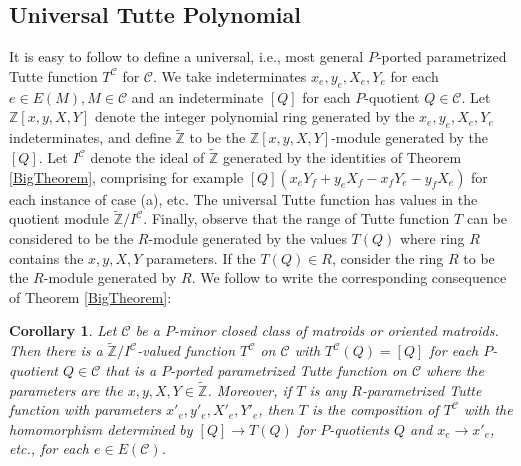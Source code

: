 \documentclass[12pt,leqno]{amsart}
\newtheorem{cor}[lem]{Corollary}
\theoremstyle{remark}
\begin{document}
\subsection{Universal Tutte Polynomial}
\label{UniversalSec}
It is easy to follow 
\cite{BollobasRiordanTuttePolyColored,Ellis-Monaghan-Traldi} to define
a universal, i.e., most general $P$-ported parametrized
Tutte function $T^{\mathcal{C}}$ for $\mathcal{C}$.
We take indeterminates $x_e, y_e, X_e, Y_e$ for each $e\in E(M), 
M\in\mathcal{C}$
and an indeterminate $[Q]$ for each $P$-quotient $Q\in\mathcal{C}$.
Let $\mathbb{Z}[x,y,X,Y]$ denote the integer polynomial ring generated by
the $x_e,y_e,X_e,Y_e$ indeterminates, and define $\widetilde{\mathbb{Z}}$
to be the $\mathbb{Z}[x,y,X,Y]$-module generated by the $[Q]$.  
Let $I^{\mathcal{C}}$ denote the ideal of $\widetilde{\mathbb{Z}}$ 
generated by the identities of Theorem \ref{BigTheorem}, comprising 
for example $[Q](x_eY_f+y_eX_f-x_fY_e-y_fX_e)$ for each instance of
case (a), etc.  The universal Tutte function has values in the
quotient module $\widetilde{\mathbb{Z}}/I^{\mathcal{C}}$.  Finally,
observe that the range of Tutte function $T$  can be considered to be the
$R$-module generated by the values $T(Q)$ where ring $R$ contains the
$x,y,X,Y$ parameters. If the $T(Q)\in R$, consider
the ring $R$ to be the $R$-module generated by $R$.
We follow \cite{Ellis-Monaghan-Traldi} to write
the corresponding consequence of Theorem \ref{BigTheorem}:

\begin{cor}
\label{UniversalCor}
Let $\mathcal{C}$ be a $P$-minor closed class of matroids or 
oriented matroids.  Then there is a 
$\widetilde{\mathbb{Z}}/I^{\mathcal{C}}$-valued function 
$T^{\mathcal{C}}$ on $\mathcal{C}$ with $T^{\mathcal{C}}(Q)=[Q]$ for each $P$-quotient
$Q\in\mathcal{C}$ that is a $P$-ported parametrized Tutte function
on $\mathcal{C}$ where the parameters are the 
$x, y, X, Y \in \widetilde{\mathbb{Z}}$.  Moreover, if $T$ is any $R$-parametrized
Tutte function with parameters $x'_e, y'_e, X'_e, Y'_e$, then $T$ is the
composition of $T^{\mathcal{C}}$ with the homomorphism determined by
$[Q]\rightarrow T(Q)$ for $P$-quotients $Q$ and 
$x_e\rightarrow x'_e$, etc., for each $e\in E(\mathcal{C})$.
\end{cor}

\end{document}
